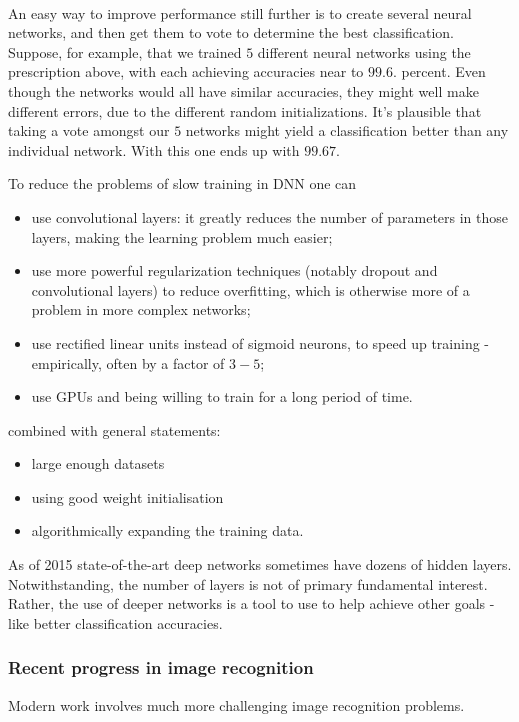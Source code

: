 {\paragraph{} An easy way to improve performance still further is to create several neural networks, and then get them to vote to determine the best classification. Suppose, for example, that we trained $5$ different neural networks using the prescription above, with each achieving accuracies near to $99.6$. percent. Even though the networks would all have similar accuracies, they might well make different errors, due to the different random initializations. It's plausible that taking a vote amongst our $5$ networks might yield a classification better than any individual network. With this one ends up with $99.67$.

To reduce the problems of slow training  in DNN one can
\begin{itemize}
\item use convolutional layers: it greatly reduces the number of parameters in those layers, making the learning problem much easier; 
\item use more powerful regularization techniques (notably dropout and convolutional layers) to reduce overfitting, which is otherwise more of a problem in more complex networks;
\item use rectified linear units instead of sigmoid neurons, to speed up training - empirically, often by a factor of $3-5$; 
\item use GPUs and being willing to train for a long period of time. 
\end{itemize}
combined with general statements:
\begin{itemize}
\item large enough datasets
\item using good weight initialisation
\item algorithmically expanding the training data.
\end{itemize}

As of 2015 state-of-the-art deep networks sometimes have dozens of hidden layers. Notwithstanding,  the number of layers is not of primary fundamental interest. Rather, the use of deeper networks is a tool to use to help achieve other goals - like better classification accuracies.

\subsubsection{Recent progress in image recognition}
Modern work involves much more challenging image recognition problems.


}
